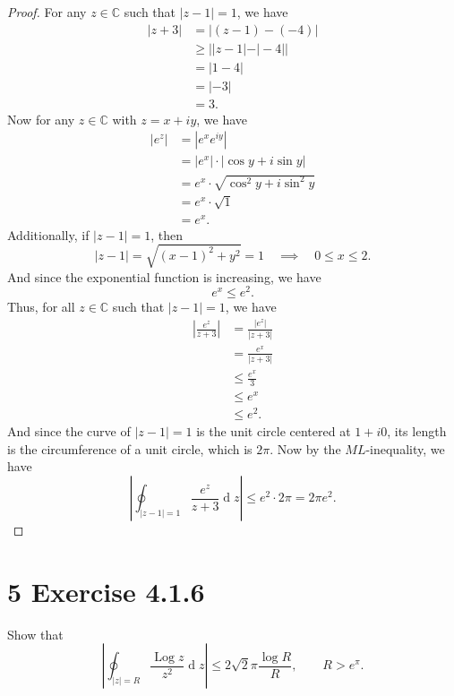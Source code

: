 \documentclass[12pt]{article}
\newenvironment{problem}
    {\begin{lrbox}{\mybox}\begin{minipage}{0.98\textwidth}}
    {\end{minipage}\end{lrbox}\framebox[\textwidth]{\usebox{\mybox}}}
\newcommand{\C}{\mathbb{C}} %
\newcommand{\<}{\left\langle} %
\renewcommand{\>}{\right\rangle} %
\newcommand{\Log}{\operatorname{Log}} %
\renewcommand{\d}[1]{\operatorname{d}\!#1} %
\begin{document}
\begin{proof}
    For any $z\in\C$ such that $|z-1|=1$, we have
    \begin{align*}
        |z+3|
            &= |(z-1) - (-4)| \\
            &\geq ||z-1| - |-4|| \\
            &= |1-4| \\
            &= |-3| \\
            &= 3.
    \end{align*}
    Now for any $z\in\C$ with $z=x+iy$, we have
    \begin{align*}
        |e^z|
            &= |e^xe^{iy}| \\
            &= |e^x|\cdot|\cos y + i\sin y| \\
            &= e^x\cdot\sqrt{\cos^2 y + i\sin^2 y} \\
            &= e^x\cdot\sqrt{1} \\
            &= e^x.
    \end{align*}
    Additionally, if $|z-1|=1$, then
    \[|z-1| = \sqrt{(x-1)^2 + y^2} = 1 \quad\implies\quad 0\leq x \leq 2.\]
    And since the exponential function is increasing, we have
    \[e^x \leq e^2.\]
    Thus, for all $z\in\C$ such that $|z-1|=1$, we have
    \begin{align*}
        \left|\frac{e^z}{z+3}\right|
            &= \frac{|e^z|}{|z+3|} \\
            &= \frac{e^x}{|z+3|} \\
            &\leq \frac{e^x}{3} \\
            &\leq e^x \\
            &\leq e^2.
    \end{align*}
    And since the curve of $|z-1|=1$ is the unit circle centered at $1+i0$, its length is the circumference of a unit circle, which is $2\pi$. Now by the $ML$-inequality, we have
    \[\left|\oint_{|z-1|=1} \frac{e^z}{z+3}\d{z}\right| \leq e^2\cdot 2\pi = 2\pi e^2.\]
    
\end{proof}

\newpage
\section*{5 Exercise 4.1.6}
\begin{problem}
    Show that
    \[\left|\oint_{|z|=R} \frac{\Log z}{z^2}\d{z}\right| \leq 2\sqrt{2}\pi\frac{\log R}{R}, \qquad R > e^\pi.\]
\end{problem}
\end{document}
